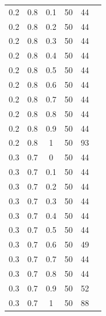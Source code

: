 \documentclass[12pt]{report}
\begin{document}
\begin{table}
\begin{minipage}[h!]{0.10\hsize}
\begin{center}
{\begin{tabular}{c@{\hspace{5mm}}c@{\hspace{5mm}}c@{\hspace{5mm}}c@{\hspace{5mm}}c@{\hspace{5mm}}c}
				0.2     &0.8    &0.1    &50    &44\\
				0.2     &0.8    &0.2    &50    &44\\
				0.2     &0.8    &0.3    &50    &44\\
				0.2     &0.8    &0.4    &50   &44\\
				0.2     &0.8    &0.5    &50   &44\\
				0.2     &0.8    &0.6    &50    &44\\
				0.2     &0.8    &0.7    &50    &44\\
				0.2     &0.8    &0.8    &50    &44\\
				0.2     &0.8    &0.9    &50    &44\\
				0.2     &0.8    &1      &50     &93\\
				\midrule
				0.3     &0.7    &0      &50    &44\\
				0.3     &0.7    &0.1    &50    &44\\
				0.3     &0.7    &0.2    &50    &44\\
				0.3     &0.7    &0.3    &50    &44\\
				0.3     &0.7    &0.4    &50    &44\\
				0.3     &0.7    &0.5    &50    &44\\
				0.3     &0.7    &0.6    &50    &49\\
				0.3     &0.7    &0.7    &50    &44\\
				0.3     &0.7    &0.8    &50    &44\\
				0.3     &0.7    &0.9    &50   &52\\
				0.3     &0.7    &1      &50    &88\\
				\bottomrule
			\end{tabular}}
			\label{T:log111}
		\end{center}
	\end{minipage}
	\hfill
	\begin{minipage}[!h]{0.50\hsize}\centering
		\begin{center}
\end{center}
\end{minipage}
\end{table}
\end{document}
